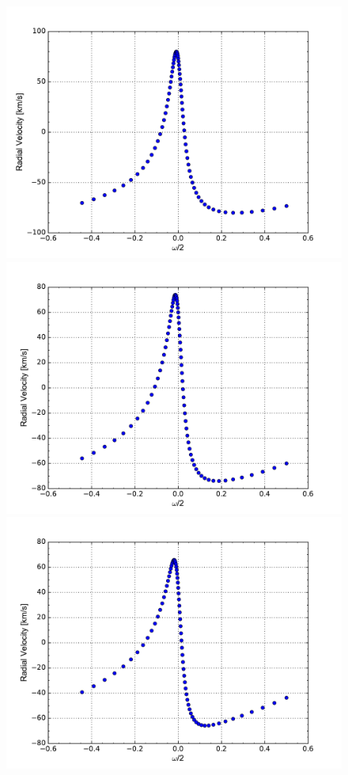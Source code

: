 \documentclass[onecolumn]{aastex6}
\begin{document}
\begin{figure}[ht]
  \includegraphics[scale=0.3]{c.pdf} \\%
  \includegraphics[scale=0.3]{d.pdf}%
  \includegraphics[scale=0.3]{e.pdf}%

\end{figure}
\end{document}
